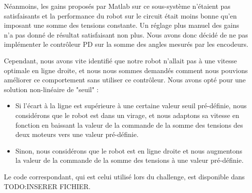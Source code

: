 \documentclass{report}
\begin{document}
Néanmoins, les gains proposés par Matlab sur ce sous-système n'étaient pas satisfaisants et la performance du robot sur le circuit était moins bonne qu'en imposant une somme des tensions constante. Un réglage plus manuel des gains n'a pas donné de résultat satisfaisant non plus. Nous avons donc décidé de ne pas implémenter le contrôleur PD sur la somme des angles mesurés par les encodeurs.

Cependant, nous avons vite identifié que notre robot n'allait pas à une vitesse optimale en ligne droite, et nous nous sommes demandés comment nous pouvions améliorer ce comportement sans utiliser ce contrôleur. Nous avons opté pour une solution non-linéaire de "seuil" : 
\begin{itemize}
    \item Si l'écart à la ligne est supérieure à une certaine valeur seuil pré-définie, nous considérons que le robot est dans un virage, et nous adaptons sa vitesse en fonction en baissant la valeur de la commande de la somme des tensions des deux moteurs vers une valeur pré-définie.
    \item Sinon, nous considérons que le robot est en ligne droite et nous augmentons la valeur de la commande de la somme des tensions à une valeur pré-définie.
\end{itemize}
Le code correspondant, qui est celui utilisé lors du challenge, est disponible dans TODO:INSERER FICHIER.
\end{document}
